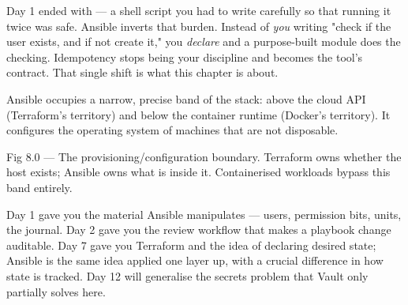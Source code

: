 \begin{keyidea}
Day 1 ended with  --- a shell script you had to write carefully so that running it twice was safe. Ansible inverts that burden. Instead of \emph{you} writing "check if the user exists, and if not create it," you \emph{declare}  and a purpose-built module does the checking. Idempotency stops being your discipline and becomes the tool's contract. That single shift is what this chapter is about.
\end{keyidea}

 Ansible occupies a narrow, precise band of the stack: above the cloud API (Terraform's territory) and below the container runtime (Docker's territory). It configures the operating system of machines that are not disposable.

\begin{wbfigure}{Fig 8.0 — The provisioning/configuration boundary. Terraform owns whether the host exists; Ansible owns what is inside it. Containerised workloads bypass this band entirely.}
\end{wbfigure}

 Day 1 gave you the material Ansible manipulates --- users, permission bits,  units, the journal. Day 2 gave you the review workflow that makes a playbook change auditable. Day 7 gave you Terraform and the idea of declaring desired state; Ansible is the same idea applied one layer up, with a crucial difference in how state is tracked. Day 12 will generalise the secrets problem that Vault only partially solves here.

